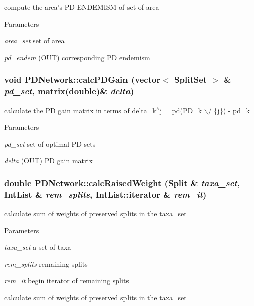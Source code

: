 \label{classPDNetwork_ae578ebf3ba8d3dff2275b7961abd9574}
compute the area's PD ENDEMISM of set of area 
\begin{DoxyParams}{Parameters}
\item[{\em area\_\-set}]set of area \item[{\em pd\_\-endem}](OUT) corresponding PD endemism \end{DoxyParams}
\hypertarget{classPDNetwork_a49a2c3d1f88418aefe5c254cb1d54c03}{
\subsubsection[{calcPDGain}]{\setlength{\rightskip}{0pt plus 5cm}void PDNetwork::calcPDGain (vector$<$ {\bf SplitSet} $>$ \& {\em pd\_\-set}, \/  matrix(double)\& {\em delta})}}
\label{classPDNetwork_a49a2c3d1f88418aefe5c254cb1d54c03}
calculate the PD gain matrix in terms of delta\_\-k$^\wedge$j = pd(PD\_\-k $\backslash$/ \{j\}) -\/ pd\_\-k 
\begin{DoxyParams}{Parameters}
\item[{\em pd\_\-set}]set of optimal PD sets \item[{\em delta}](OUT) PD gain matrix \end{DoxyParams}
\hypertarget{classPDNetwork_adbdf5778b7d6b1468d9a32c831d0f951}{
\subsubsection[{calcRaisedWeight}]{\setlength{\rightskip}{0pt plus 5cm}double PDNetwork::calcRaisedWeight ({\bf Split} \& {\em taxa\_\-set}, \/  IntList \& {\em rem\_\-splits}, \/  IntList::iterator \& {\em rem\_\-it})}}
\label{classPDNetwork_adbdf5778b7d6b1468d9a32c831d0f951}
calculate sum of weights of preserved splits in the taxa\_\-set 
\begin{DoxyParams}{Parameters}
\item[{\em taxa\_\-set}]a set of taxa \item[{\em rem\_\-splits}]remaining splits \item[{\em rem\_\-it}]begin iterator of remaining splits\end{DoxyParams}
calculate sum of weights of preserved splits in the taxa\_\-set 
